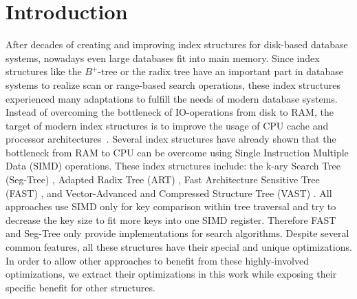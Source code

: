 \documentclass[runningheads,a4paper]{llncs}
\begin{document}
\section{Introduction}
After decades of creating and improving index structures for disk-based database systems, nowadays even large databases fit into main memory. Since index structures like the $B^+$-tree or the radix tree have an important part in database systems to realize scan or range-based search operations, these index structures experienced many adaptations to fulfill the needs of modern database systems. Instead of overcoming the bottleneck of IO-operations from disk to RAM, the target of modern index structures is to improve the usage of CPU cache and processor architectures~\cite{BBHS14}.
Several index structures have already shown that the bottleneck from RAM to CPU can be overcome using Single Instruction Multiple Data (SIMD) \cite{suaib2011architecture,BS17,BBS14} operations. These index structures include: the k-ary Search Tree (Seg-Tree) \cite{zeuch2014adapting}, Adapted Radix Tree (ART) \cite{leis2013adaptive}, Fast Architecture Sensitive Tree (FAST) \cite{kim2010fast}, and Vector-Advanced and Compressed Structure Tree (VAST) \cite{yamamuro2012vast}. %
All approaches use SIMD only for key comparison within tree traversal and try to decrease the key size to fit more keys into one SIMD register. Therefore FAST and Seg-Tree only provide implementations for search algorithms. Despite several common features, all these structures have their special and unique optimizations. In order to allow other approaches to benefit from these highly-involved optimizations, we extract their optimizations in this work while exposing their specific benefit for other structures.
\end{document}
